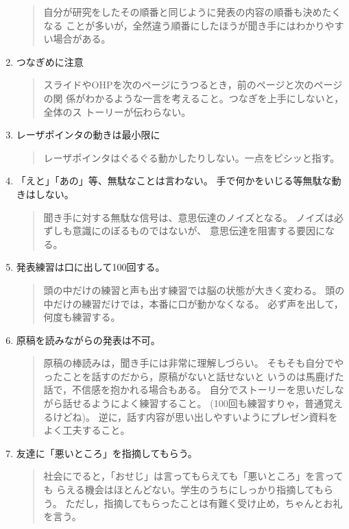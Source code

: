 \documentclass[12pt, ]{jsarticle}
\begin{document}
\begin{enumerate}
  \begin{quote}
  自分が研究をしたその順番と同じように発表の内容の順番も決めたくなる
  ことが多いが，全然違う順番にしたほうが聞き手にはわかりやすい場合がある。
  \end{quote}
\item
  つなぎめに注意

  \begin{quote}
  スライドやOHPを次のページにうつるとき，前のページと次のページの関
  係がわかるような一言を考えること。つなぎを上手にしないと，全体のス
  トーリーが伝わらない。
  \end{quote}
\item
  レーザポインタの動きは最小限に

  \begin{quote}
  レーザポインタはぐるぐる動かしたりしない。一点をピシッと指す。
  \end{quote}
\item
  「えと」「あの」等、無駄なことは言わない。
  手で何かをいじる等無駄な動きはしない。

  \begin{quote}
  聞き手に対する無駄な信号は、意思伝達のノイズとなる。
  ノイズは必ずしも意識にのぼるものではないが、
  意思伝達を阻害する要因になる。
  \end{quote}
\item
  発表練習は口に出して100回する。

  \begin{quote}
  頭の中だけの練習と声も出す練習では脳の状態が大きく変わる。
  頭の中だけの練習だけでは，本番に口が動かなくなる。
  必ず声を出して，何度も練習する。
  \end{quote}
\item
  原稿を読みながらの発表は不可。

  \begin{quote}
  原稿の棒読みは，聞き手には非常に理解しづらい。
  そもそも自分でやったことを話すのだから，原稿がないと話せないと
  いうのは馬鹿げた話で，不信感を抱かれる場合もある。
  自分でストーリーを思いだしながら話せるようによく練習すること。
  (100回も練習すりゃ，普通覚えるけどね)。
  逆に，話す内容が思い出しやすいようにプレゼン資料をよく工夫すること。
  \end{quote}
\item
  友達に「悪いところ」を指摘してもらう。

  \begin{quote}
  社会にでると，「おせじ」は言ってもらえても「悪いところ」を言っても
  らえる機会はほとんどない。学生のうちにしっかり指摘してもらう。
  ただし，指摘してもらったことは有難く受け止め，ちゃんとお礼を言う。
  \end{quote}
\end{enumerate}
\end{document}
